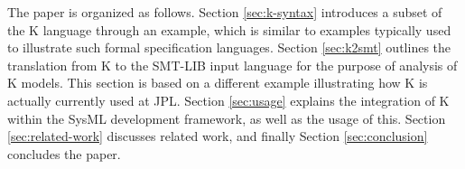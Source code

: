 The paper is organized as follows. Section \ref{sec:k-syntax}
introduces a subset of the K language through an example, which is
similar to examples typically used to illustrate such formal
specification languages. Section \ref{sec:k2smt} outlines the
translation from K to the SMT-LIB input language for the purpose of
analysis of K models. This section is based on a different example
illustrating how K is actually currently used at JPL. Section
\ref{sec:usage} explains the integration of K within the SysML
development framework, as well as the usage of this. Section
\ref{sec:related-work} discusses related work, and finally Section
\ref{sec:conclusion} concludes the paper. 

